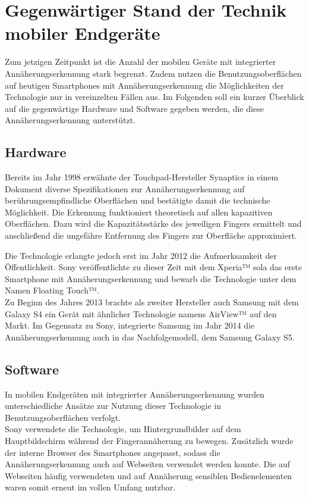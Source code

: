 \documentclass[a4paper,12pt,bibliography=totoc]{scrreprt}%
\begin{document}
\section{Gegenwärtiger Stand der Technik mobiler Endgeräte}
Zum jetzigen Zeitpunkt ist die Anzahl der mobilen Geräte mit integrierter Annäherungserkennung stark begrenzt. Zudem nutzen die Benutzungsoberflächen auf heutigen Smartphones mit Annäherungserkennung die Möglichkeiten der Technologie nur in vereinzelten Fällen aus. Im Folgenden soll ein kurzer Überblick auf die gegenwärtige Hardware und Software gegeben werden, die diese Annäherungserkennung unterstützt.

\subsection{Hardware}
Bereits im Jahr 1998 erwähnte der Touchpad-Hersteller Synaptics in einem Dokument diverse Spezifikationen zur Annäherungserkennung auf berührungsempfindliche Oberflächen und bestätigte damit die technische Möglichkeit. Die Erkennung funktioniert theoretisch auf allen kapazitiven Oberflächen. Dazu wird die Kapazitätsstärke des jeweiligen Fingers ermittelt und anschließend die ungefähre Entfernung des Fingers zur Oberfläche approximiert.\cite{synaptics}

Die Technologie erlangte jedoch erst im Jahr 2012 die Aufmerksamkeit der Öffentlichkeit. Sony veröffentlichte zu dieser Zeit mit dem Xperia™ sola das erste Smartphone mit Annäherungserkennung und bewarb die Technologie unter dem Namen Floating Touch™.\\
Zu Beginn des Jahres 2013 brachte als zweiter Hersteller auch Samsung mit dem Galaxy S4 ein Gerät mit ähnlicher Technologie namens AirView™ auf den Markt. Im Gegensatz zu Sony, integrierte Samsung im Jahr 2014 die Annäherungserkennung auch in das Nachfolgemodell, dem Samsung Galaxy S5.

\subsection{Software}
In mobilen Endgeräten mit integrierter Annäherungserkennung wurden unterschiedliche Ansätze zur Nutzung dieser Technologie in Benutzungsoberflächen verfolgt.\\
Sony verwendete die Technologie, um Hintergrundbilder auf dem Hauptbildschirm während der Fingerannäherung zu bewegen. Zusätzlich wurde der interne Browser des Smartphones angepasst, sodass die Annäherungserkennung auch auf Webseiten verwendet werden konnte. Die auf Webseiten häufig verwendeten und auf Annäherung sensiblen Bedienelementen waren somit erneut im vollen Umfang nutzbar.
\end{document}
